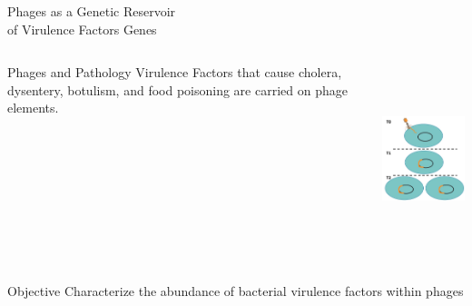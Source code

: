 \documentclass[11pt, xcolor=table]{beamer}
\begin{document}
	
	
	\begin{frame}{Phages as a Genetic Reservoir \\ of Virulence Factors Genes}
	\begin{columns}
	\vspace{-1cm}
	\begin{block}{Phages and Pathology}
	Virulence Factors that cause cholera, dysentery, botulism, and food poisoning are carried on phage elements.
	\end{block}
	
	\includegraphics[height=5.5cm, width=5cm]{CPBS_11_18/lysogeny.jpg} \\
	\hspace{0.5cm}	
	\end{columns}
	\vspace{-1cm}
	\begin{block}{Objective}
	Characterize the abundance of bacterial virulence factors within phages
	\end{block}
	
	\end{frame}
\end{document}
